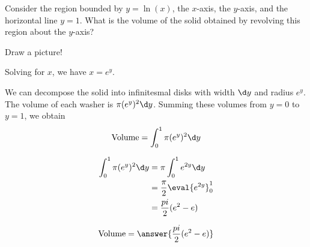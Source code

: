 \documentclass{ximera}
\author{Steven Gubkin}
\begin{document}
\begin{exercise}



Consider the region bounded by $y =\ln(x)$, the $x$-axis, the
$y$-axis, and the horizontal line $y=1$.  What is the volume of the
solid obtained by revolving this region about the $y$-axis?

\begin{hint}
	Draw a picture!
\end{hint}

\begin{hint}
  Solving for $x$, we have $x = e^y$.  
\end{hint}

\begin{hint}
  We can decompose the solid into infinitesmal disks with width $\d y$
  and radius $e^y$.  The volume of each washer is $\pi (e^y)^2\d y$.
  Summing these volumes from $y=0$ to $y=1$, we obtain
  \[
  \textrm{Volume} = \int_0^1 \pi (e^y)^2\d y
  \]
\end{hint}

\begin{hint}
  \begin{align*}
    \int_0^1 \pi (e^y)^2\d y &= \pi \int_0^1e^{2y}\d y \\
    &=\frac{\pi}{2}\eval{e^{2y}}_0^1\\
    &=\frac{pi}{2}(e^2-e)
  \end{align*}
\end{hint}

\begin{prompt}
  \[
  \textrm{Volume} = \answer{\frac{pi}{2}(e^2-e)}
  \]
\end{prompt}

\end{exercise}
\end{document}
